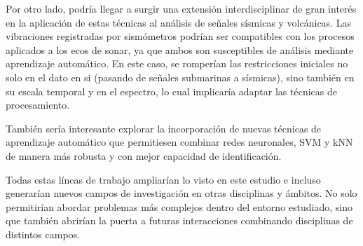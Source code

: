 \documentclass[a4paper,10pt]{article}
\begin{document}
Por otro lado, podría llegar a surgir una extensión interdisciplinar de gran interés en la aplicación de estas técnicas al análisis de señales sísmicas y volcánicas. Las vibraciones registradas por sismómetros podrían ser compatibles con los procesos aplicados a los ecos de sonar, ya que ambos son susceptibles de análisis mediante aprendizaje automático. En este caso, se romperían las restricciones iniciales no solo en el dato en si (pasando de señales submarinas a sísmicas), sino también en su escala temporal y en el espectro, lo cual implicaría adaptar las técnicas de procesamiento.

También sería interesante explorar la incorporación de nuevas técnicas de aprendizaje automático que permitiesen combinar redes neuronales, SVM y kNN de manera más robusta y con mejor capacidad de identificación. 

Todas estas líneas de trabajo ampliarían lo visto en este estudio e incluso generarían nuevos campos de investigación en otras disciplinas y ámbitos. No solo permitirían abordar problemas más complejos dentro del entorno estudiado, sino que también abrirían la puerta a futuras interacciones combinando disciplinas de distintos campos.

\newpage
 

\end{document}
